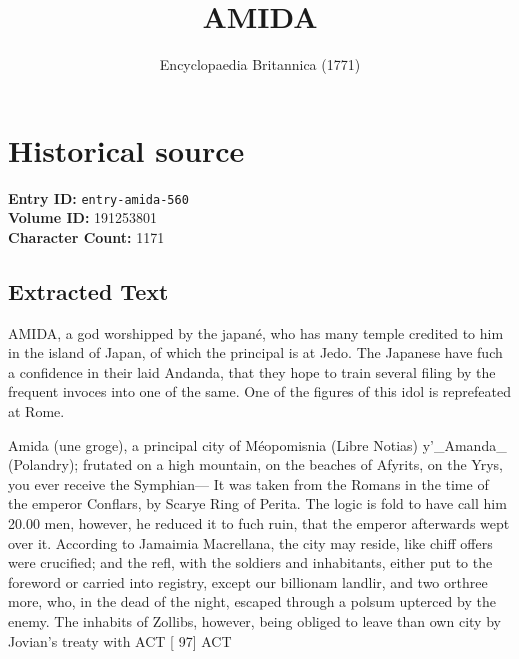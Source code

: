 \documentclass{article}
\title{AMIDA}
\date{Encyclopaedia Britannica (1771)}
\begin{document}
\maketitle

\section*{Historical source}
\textbf{Entry ID:} \texttt{entry-amida-560} \\
\textbf{Volume ID:} 191253801 \\
\textbf{Character Count:} 1171

\subsection*{Extracted Text}
AMIDA, a god worshipped by the japané, who has many temple credited to him in the island of Japan, of which the principal is at Jedo. The Japanese have fuch a confidence in their laid Andanda, that they hope to train several filing by the frequent invoces into one of the same. One of the figures of this idol is reprefeated at Rome.

Amida (une groge), a principal city of Méopomisnia (Libre Notias) y'\_Amanda\_ (Polandry); frutated on a high mountain, on the beaches of Afyrits, on the Yrys, you ever receive the Symphian— It was taken from the Romans in the time of the emperor Conflars, by Scarye Ring of Perita. The logic is fold to have call him 20.00 men, however, he reduced it to fuch ruin, that the emperor afterwards wept over it. According to Jamaimia Macrellana, the city may reside, like chiff offers were crucified; and the refl, with the soldiers and inhabitants, either put to the foreword or carried into registry, except our billionam landlir, and two orthree more, who, in the dead of the night, escaped through a polsum upterced by the enemy. The inhabits of Zollibs, however, being obliged to leave than own city by Jovian’s treaty with ACT [ 97] ACT
\end{document}
